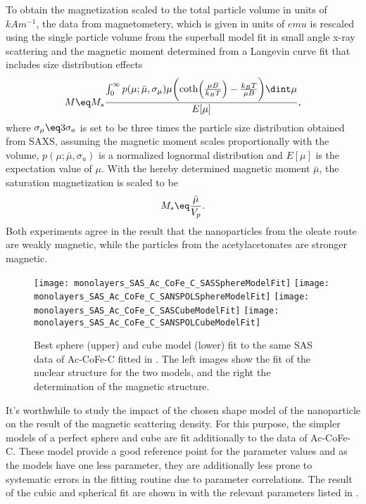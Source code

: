 \documentclass[\main/dresen_thesis.tex]{subfiles}
\begin{document}
    To obtain the magnetization scaled to the total particle volume in units of $\unit{kAm^{-1}}$, the data from magnetometery, which is given in units of $\unit{emu}$ is rescaled using the single particle volume from the superball model fit in small angle x-ray scattering and the magnetic moment determined from a Langevin curve fit that includes size distribution effects
    \begin{align}
      M \eq M_s
      \frac
      {\int_{0}^{\infty} p(\mu; \bar{\mu}, \sigma_\mu) \mu \biggl( \coth\Bigl(\frac{\mu B}{k_B T} \Bigr) - \frac{k_B T}{\mu B} \biggr) \dint \mu}
      {E[\mu]},
    \end{align}
    where $\sigma_\mu \eq 3 \sigma_a$ is set to be three times the particle size distribution obtained from SAXS, assuming the magnetic moment scales proportionally with the volume, $p(\mu; \bar{\mu}, \sigma_u)$ is a normalized lognormal distribution and $E[\mu]$ is the expectation value of $\mu$.
    With the hereby determined magnetic moment $\bar{\mu}$, the saturation magnetization is scaled to be
    \begin{align}
      M_s \eq \frac{\bar{\mu}}{V_p}.
    \end{align}
    Both experiments agree in the result that the nanoparticles from the oleate route are weakly magnetic, while the particles from the acetylacetonates are stronger magnetic.

    \begin{figure}[tb]
      \centering
      \texttt{[image: monolayers\_SAS\_Ac\_CoFe\_C\_SASSphereModelFit]}
      \texttt{[image: monolayers\_SAS\_Ac\_CoFe\_C\_SANSPOLSphereModelFit]}
      \texttt{[image: monolayers\_SAS\_Ac\_CoFe\_C\_SASCubeModelFit]}
      \texttt{[image: monolayers\_SAS\_Ac\_CoFe\_C\_SANSPOLCubeModelFit]}
      \caption{\label{fig:monolayers:nanoparticle:sas:SphereCubeFit}Best sphere (upper) and cube model (lower) fit to the same SAS data of Ac-CoFe-C fitted in . The left images show the fit of the nuclear structure for the two models, and the right the determination of the magnetic structure.}
    \end{figure}

    It's worthwhile to study the impact of the chosen shape model of the nanoparticle on the result of the magnetic scattering density.
    For this purpose, the simpler models of a perfect sphere and cube are fit additionally to the data of Ac-CoFe-C.
    These model provide a good reference point for the parameter values and as the models have one less parameter, they are additionally less prone to systematic errors in the fitting routine due to parameter correlations.
    The result of the cubic and spherical fit are shown in  with the relevant parameters listed in .
\end{document}
